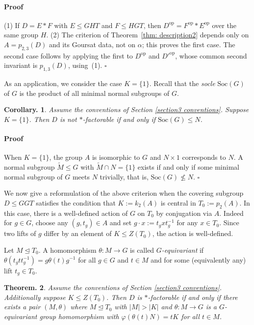 \documentclass[12pt]{article}
\theoremstyle{change}
\newtheorem{theorem}{Theorem.}[section]
\newtheorem{coro}[theorem]{Corollary.}
\newenvironment{proof}{\paragraph{Proof}}{\hfill$\square$}
\renewcommand{\le}{\leqslant} %
\newcommand{\Soc}{\mathrm{Soc}}
\newcommand{\1}{{\bf 1}}
\begin{document}
\begin{proof}
(1) If $D=E\ast F$ with $E\le GHT$ and $F\le HGT$, then $D^{\mathrm{op}}=F^{\mathrm{op}}\ast
E^{\mathrm{op}}$ over the same group $H$. (2) The criterion of Theorem~\ref{thm: description2}
depends only on $A=p_{2,3}(D)$ and its Goursat data, not on $\alpha$; this proves the first case.
The second case follows by applying the first to $D^{\mathrm{op}}$ and $D'^{\mathrm{op}}$, whose
common second invariant is $p_{1,3}(D)$, using~(1).
\end{proof}

\smallskip

As an application, we consider the case $K = \{1\}$.  Recall that the \emph{socle} $\Soc(G)$ of $G$ is the product of all minimal normal subgroups of $G$.
\begin{coro}\label{cor:socle}
Assume the conventions of Section \ref{section3 conventions}. Suppose $K = \{1\}$.  Then $D$ is not $\ast$-factorable if and only if
$\Soc(G) \leq N$.
\end{coro}
\begin{proof}
When $K = \{1\}$, the group $A$ is isomorphic to $G$ and $N\times 1$
corresponds to $N$.  A normal subgroup $\widetilde{M}\le G$ with $\widetilde{M} \cap N = \{1\}$ exists if and only if
some minimal normal subgroup of $G$ meets $N$ trivially, that is, $\Soc(G) \not\leq N$.
\end{proof}

We now give a reformulation of the above criterion when the covering subgroup $D\le GGT$ satisfies the condition that $K:=k_2(A)$ is central in $T_0:= p_2(A)$. In this case, there is a well-defined action of $G$ on $T_0$ by conjugation via $A$. Indeed for $g \in G$, choose any $(g, t_g) \in A$ and set $g \cdot x := t_g x t_g^{-1}$ for any $x\in T_0$.  Since two lifts of $g$ differ by an element of $K \leq Z(T_0)$, the action is well-defined.

Let $M \unlhd T_0$. A homomorphism $\theta\colon M \to G$ is called \emph{$G$-equivariant} if $\theta(t_g t t_g^{-1}) = g \theta(t)
g^{-1}$ for all $g \in G$ and $t \in M$ and for some (equivalently any) lift $t_g\in T_0$.

\begin{theorem}\label{thm: description3}
Assume the conventions of Section \ref{section3 conventions}. Additionally suppose $K\le Z(T_0)$. Then $D$ is $\ast$-factorable if and only if there exists a pair $(M, \theta)$ where $M \trianglelefteq T_0$ with $|M| > |K|$ and
$\theta\colon M \to G$ is a $G$-equivariant group homomorphism with          $\varphi(\theta(t)N) = tK$ for all $t \in M$.
\end{theorem}
\end{document}
